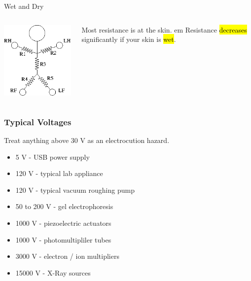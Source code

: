 \documentclass{presentation}
\begin{document}
\begin{frame}{Wet and Dry}
  \begin{columns}
    \begin{column}{0.33\textwidth}
      \includegraphics[width=\textwidth]{"./resistor-person.png"}
    \end{column}
    \begin{column}{0.67\textwidth}
      Most resistance is at the skin.
       em
      Resistance \hl{decreases} significantly if your skin is \hl{wet}.
    \end{column}
  \end{columns}
\end{frame}

\begin{frame}
  \frametitle{Typical Voltages}
  Treat anything above 30 V as an electrocution hazard.
  \begin{itemize}
    \item 5 V - USB power supply
    \item 120 V - typical lab appliance
    \item 120 V - typical vacuum roughing pump
    \item 50 to 200 V - gel electrophoresis
    \item 1000 V - piezoelectric actuators
    \item 1000 V - photomultipliler tubes
    \item 3000 V - electron / ion multipliers
    \item 15000 V - X-Ray sources
  \end{itemize}
\end{frame}
\end{document}
